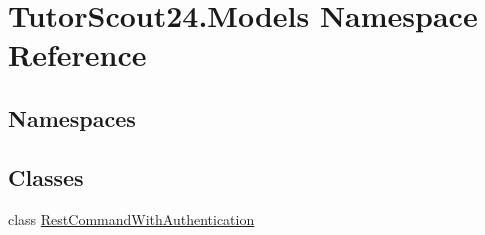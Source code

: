 \hypertarget{namespace_tutor_scout24_1_1_models}{}\section{Tutor\+Scout24.\+Models Namespace Reference}
\label{namespace_tutor_scout24_1_1_models}
\subsection*{Namespaces}
\begin{DoxyCompactItemize}
\end{DoxyCompactItemize}
\subsection*{Classes}
\begin{DoxyCompactItemize}
\item 
class \mbox{\hyperlink{class_tutor_scout24_1_1_models_1_1_rest_command_with_authentication}{Rest\+Command\+With\+Authentication}}
\end{DoxyCompactItemize}
